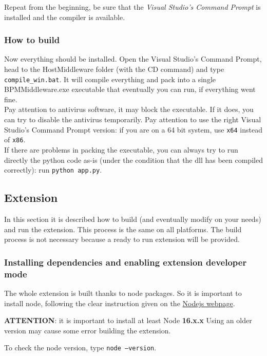 Repeat from the beginning, be sure that the \textit{Visual Studio's Command Prompt} is installed and the compiler is available.

\subsubsection{How to build}
Now everything should be installed. Open the Visual Studio's Command Prompt, head to the HostMiddleware folder (with the CD command) and type \texttt{compile\_win.bat}. It will compile everything and pack into a single BPMMiddleware.exe executable that eventually you can run, if everything went fine.\\

Pay attention to antivirus software, it may block the executable. If it does, you can try to disable the antivirus temporarily. Pay attention to use the right Visual Studio's Command Prompt version: if you are on a 64 bit system, use \texttt{x64} instead of \texttt{x86}.\\

If there are problems in packing the executable, you can always try to run directly the python code as-is (under the condition that the dll has been compiled correctly): run \texttt{python app.py}.

\subsection{Extension}

In this section it is described how to build (and eventually modify on your needs) and run the extension. This process is the same on all platforms.
The build process is not necessary because a ready to run extension will be provided.

\subsubsection{Installing dependencies and enabling extension developer mode}
The whole extension is built thanks to node packages. So it is important to install node, following the clear instruction given on the \href{https://nodejs.org/}{Nodejs webpage}.

\begin{warning}
	\textbf{ATTENTION}: it is important to install at least Node \textbf{16.x.x} Using an older version may cause some error building the extension.
\end{warning}
To check the node version, type \texttt{node --version}. 

